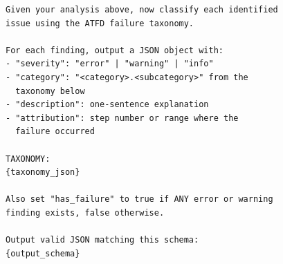 \documentclass[11pt]{article}
\begin{document}
\begin{lstlisting}[language={},breaklines=true]
Given your analysis above, now classify each identified
issue using the ATFD failure taxonomy.

For each finding, output a JSON object with:
- "severity": "error" | "warning" | "info"
- "category": "<category>.<subcategory>" from the
  taxonomy below
- "description": one-sentence explanation
- "attribution": step number or range where the
  failure occurred

TAXONOMY:
{taxonomy_json}

Also set "has_failure" to true if ANY error or warning
finding exists, false otherwise.

Output valid JSON matching this schema:
{output_schema}
\end{lstlisting}
\end{document}
